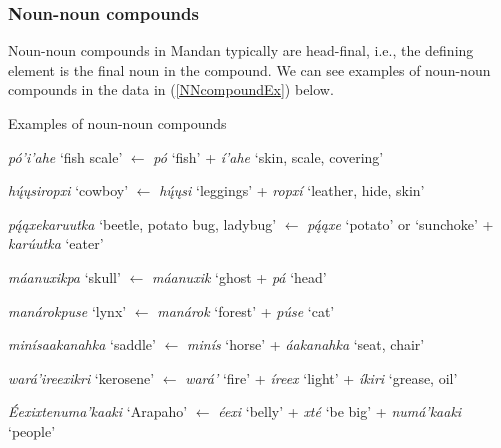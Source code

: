 \subsubsection{Noun-noun compounds}\label{SubSubSecNNcompounds}

Noun-noun compounds in Mandan typically are head-final, i.e., the defining element is the final noun in the compound. We can see examples of noun-noun compounds in the data in (\ref{NNcompoundEx}) below.

\begin{exe}

\item\label{NNcompoundEx} Examples of noun-noun compounds

    \begin{xlist}
    
    \item\label{NNcompoundEx1} \textit{pó'i'ahe} `fish scale'  $\leftarrow$ \textit{pó} `fish' + \textit{í'ahe} `skin, scale, covering'
    
    \item\label{NNcompoundEx2} \textit{hų́ųsiropxi}
    `cowboy' $\leftarrow$ \textit{hų́ųsi} `leggings' + \textit{ropxí} `leather, hide, skin'
    
    \item\label{NNcompoundEx3} \textit{pą́ąxekaruutka} `beetle, potato bug, ladybug' $\leftarrow$ \textit{pą́ąxe} `potato' or `sunchoke' + \textit{karúutka} `eater'
    
    \item\label{NNcompoundEx4} \textit{máanuxikpa} `skull' $\leftarrow$ \textit{máanuxik} `ghost + \textit{pá} `head'
    
    \item\label{NNcompoundEx5} \textit{manárokpuse} `lynx' $\leftarrow$ \textit{manárok} `forest' + \textit{púse} `cat'
    
    \item\label{NNcompoundEx6} \textit{minísaakanahka} `saddle' $\leftarrow$ \textit{minís} `horse' + \textit{áakanahka} `seat, chair'
    
    \item\label{NNcompoundEx7} \textit{wará'ireexikri} `kerosene' $\leftarrow$ \textit{wará'} `fire' + \textit{íreex} `light' + \textit{íkiri} `grease, oil'
    
    \item\label{NNcompoundEx8} \textit{Éexixtenuma'kaaki} `Arapaho' $\leftarrow$ \textit{éexi} `belly' + \textit{xté} `be big' + \textit{numá'kaaki} `people'
    
    \end{xlist}

\end{exe}


